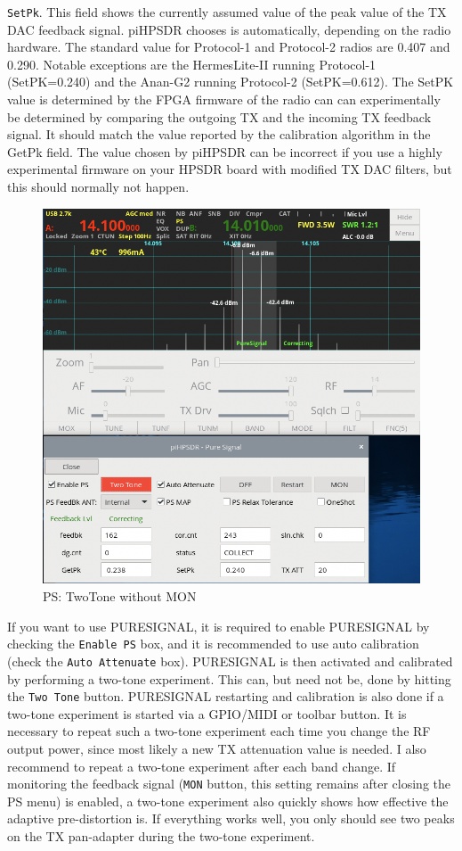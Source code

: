 \documentclass[12pt]{book}
\def\rett#1{\texttt{\color{red}#1}}
\def\pH{pi\-HPSDR\xspace}
\begin{document}
\rett{SetPk}. This field shows the currently assumed value of the peak value of the TX DAC
feedback signal. \pH chooses is automatically, depending on the radio hardware.
The standard value for Protocol-1 and Protocol-2 radios are 0.407 and 0.290. Notable exceptions are
the HermesLite-II running Protocol-1 (SetPK=0.240) and the Anan-G2 running Protocol-2 (SetPK=0.612).
The SetPK value is determined by the FPGA firmware of the radio can can experimentally
be determined by comparing the outgoing TX and the incoming TX feedback signal.
It should match the value reported
by the calibration algorithm in the GetPk field. The  value
chosen by \pH can be incorrect if you use a highly experimental firmware on your
HPSDR board with modified TX DAC filters, but this should normally not happen.

\begin{figure}[t!]
\center
\includegraphics[scale=0.45]{PSnomon.png}
\caption{PS: TwoTone without MON}
\label{fig:PSnomon}
\end{figure}

If you want to use PURESIGNAL, it is required to enable PURESIGNAL by checking the
\rett{Enable PS} box, and it is recommended to use auto calibration (check the
\rett{Auto Attenuate} box). PURESIGNAL is then activated and calibrated by
performing a two-tone experiment. This can, but need not be, done by hitting
the \rett{Two Tone} button. PURESIGNAL restarting and calibration is also done
if a two-tone experiment is started via a GPIO/MIDI or toolbar button.
It is necessary to repeat such a two-tone experiment each time you change the
RF output power, since most likely a new TX attenuation value is needed. I also
recommend to repeat a two-tone experiment after each band change. If monitoring
the feedback signal (\rett{MON} button, this setting remains after closing the
PS menu) is enabled, a two-tone experiment also quickly shows how effective
the adaptive pre-distortion is. If everything works well, you only should see
two peaks on the TX pan-adapter during the two-tone experiment.
\end{document}
